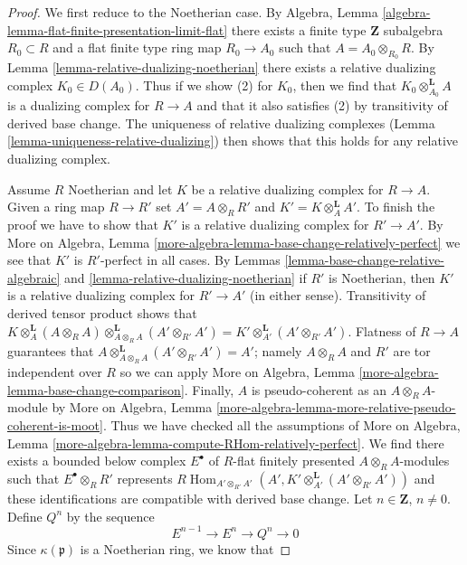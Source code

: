 \documentclass{stacks-project}
\theoremstyle{plain}
\theoremstyle{definition}
\theoremstyle{remark}
\numberwithin{equation}{subsection}
\def\Hom{\mathop{\mathrm{Hom}}\nolimits}
\begin{document}
\begin{proof}
We first reduce to the Noetherian case. By
Algebra, Lemma \ref{algebra-lemma-flat-finite-presentation-limit-flat}
there exists a finite type $\mathbf{Z}$ subalgebra $R_0 \subset R$
and a flat finite type ring map $R_0 \to A_0$ such that
$A = A_0 \otimes_{R_0} R$. By Lemma \ref{lemma-relative-dualizing-noetherian}
there exists a relative
dualizing complex $K_0 \in D(A_0)$.
Thus if we show (2) for $K_0$, then we find that
$K_0 \otimes_{A_0}^\mathbf{L} A$ is
a dualizing complex for $R \to A$ and that it also satisfies (2)
by transitivity of derived base change.
The uniqueness of relative dualizing complexes
(Lemma \ref{lemma-uniqueness-relative-dualizing})
then shows that this holds for
any relative dualizing complex.

\medskip\noindent
Assume $R$ Noetherian and let $K$ be a relative dualizing complex
for $R \to A$. Given a ring map $R \to R'$ set $A' = A \otimes_R R'$
and $K' = K \otimes_A^\mathbf{L} A'$. To finish the proof we have
to show that $K'$ is a relative dualizing complex for $R' \to A'$.
By More on Algebra, Lemma
\ref{more-algebra-lemma-base-change-relatively-perfect}
we see that $K'$ is $R'$-perfect in all cases.
By Lemmas \ref{lemma-base-change-relative-algebraic} and
\ref{lemma-relative-dualizing-noetherian}
if $R'$ is Noetherian, then $K'$ is a relative dualizing complex
for $R' \to A'$ (in either sense).
Transitivity of derived tensor product shows that
$K \otimes_A^\mathbf{L} (A \otimes_R A)
\otimes_{A \otimes_R A}^\mathbf{L} (A' \otimes_{R'} A') =
K' \otimes_{A'}^\mathbf{L} (A' \otimes_{R'} A')$.
Flatness of $R \to A$ guarantees that
$A \otimes_{A \otimes_R A}^\mathbf{L} (A' \otimes_{R'} A') = A'$;
namely $A \otimes_R A$ and $R'$ are tor independent over $R$
so we can apply More on Algebra, Lemma
\ref{more-algebra-lemma-base-change-comparison}.
Finally, $A$ is pseudo-coherent as an $A \otimes_R A$-module
by More on Algebra, Lemma
\ref{more-algebra-lemma-more-relative-pseudo-coherent-is-moot}. Thus
we have checked all the assumptions of
More on Algebra, Lemma
\ref{more-algebra-lemma-compute-RHom-relatively-perfect}.
We find there exists a bounded below complex
$E^\bullet$ of $R$-flat finitely presented $A \otimes_R A$-modules
such that $E^\bullet \otimes_R R'$ represents
$R\Hom_{A' \otimes_{R'} A'}(A',
K' \otimes_{A'}^\mathbf{L} (A' \otimes_{R'} A'))$
and these identifications are compatible with derived base change.
Let $n \in \mathbf{Z}$, $n \not = 0$.
Define $Q^n$ by the sequence
$$
E^{n - 1} \to E^n \to Q^n \to 0
$$
Since $\kappa(\mathfrak p)$ is a Noetherian ring, we know that

\end{proof}
\end{document}
